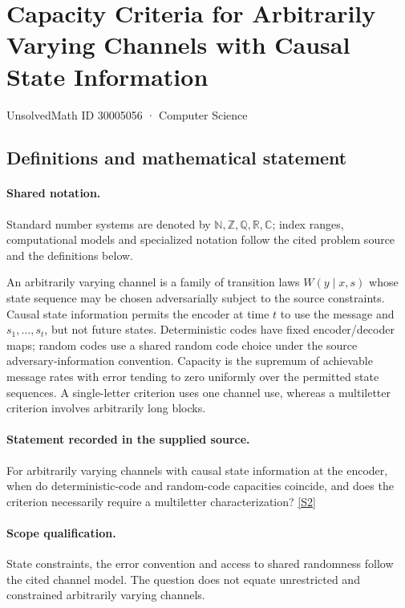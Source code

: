 \documentclass[11pt]{article}
\newcommand{\sref}[2]{\hyperlink{source:#1:#2}{[S#2]}}
\begin{document}
\setcounter{section}{30005055}
\section{Capacity Criteria for Arbitrarily Varying Channels with Causal State Information}\label{30005056}
{\small\sffamily UnsolvedMath ID 30005056 · Computer Science}
\subsection{Definitions and mathematical statement}

\paragraph{Shared notation.}Standard number systems are denoted by $\mathbb N,\mathbb Z,\mathbb Q,\mathbb R,\mathbb C$; index ranges, computational models and specialized notation follow the cited problem source and the definitions below.


An arbitrarily varying channel is a family of transition laws $W(y\mid x,s)$ whose state sequence may be chosen adversarially subject to the source constraints. Causal state information permits the encoder at time $t$ to use the message and $s_1,\ldots,s_t$, but not future states. Deterministic codes have fixed encoder/decoder maps; random codes use a shared random code choice under the source adversary-information convention. Capacity is the supremum of achievable message rates with error tending to zero uniformly over the permitted state sequences. A single-letter criterion uses one channel use, whereas a multiletter criterion involves arbitrarily long blocks.
\paragraph{Statement recorded in the supplied source.}
For arbitrarily varying channels with causal state information at the encoder, when do deterministic-code and random-code capacities coincide, and does the criterion necessarily require a multiletter characterization? \sref{30005056}{2}
\paragraph{Scope qualification.}
State constraints, the error convention and access to shared randomness follow the cited channel model. The question does not equate unrestricted and constrained arbitrarily varying channels.
\end{document}

